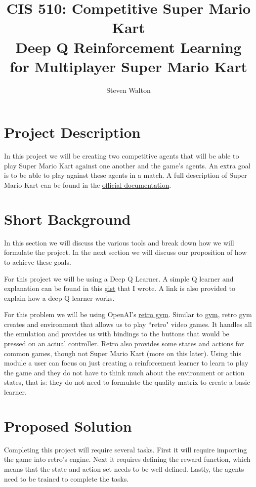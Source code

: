 \documentclass[12pt,letter]{article}
\begin{document}
\title{CIS 510: Competitive Super Mario Kart\\
\large Deep Q Reinforcement Learning for Multiplayer Super Mario Kart}
\author{Steven Walton}
\maketitle

\section{Project Description}
In this project we will be creating two competitive agents that will be able to
play Super Mario Kart against one another and the game's agents. An extra goal 
is to be able to play against these agents in a match. A full description 
of Super Mario Kart can be found in the 
\href{https://www.nintendo.co.jp/clvs/manuals/common/pdf/CLV-P-SAAFE.pdf}
{official documentation}.

\section{Short Background}
In this section we will discuss the various tools and break down how we will
formulate the project. In the next section we will discuss our proposition of
how to achieve these goals.

For this project we will be using a Deep Q Learner. A simple Q learner and
explanation can be found in this 
\href{https://gist.github.com/stevenwalton/4e4b664d494b35be2d6882c7e50eb893}
{gist} that I wrote. A link is also provided to explain how a deep Q learner
works. 

For this problem we will be using OpenAI's \href{https://github.com/openai/retro/}
{retro gym}. Similar to \href{https://github.com/openai/gym}{gym}, retro gym 
creates and environment that allows us to play ``retro" video games. It handles
all the emulation and provides us with bindings to the buttons that would be
pressed on an actual controller. Retro also provides some states and actions for
common games, though not Super Mario Kart (more on this later). Using this
module a user can focus on just creating a reinforcement learner to learn to 
play the game and they do not have to think much about the environment or action
states, that is: they do not need to formulate the quality matrix to create a
basic learner. 

\section{Proposed Solution}
Completing this project will require several tasks. First it will require importing
the game into retro's engine. Next it requires defining the reward function, which
means that the state and action set needs to be well defined. Lastly, the agents
need to be trained to complete the tasks.
\end{document}

